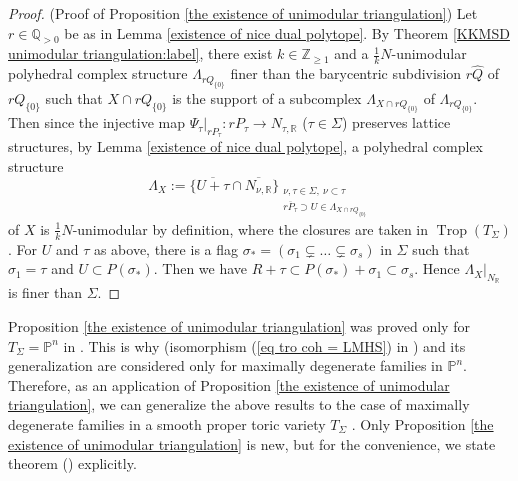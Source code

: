 \documentclass[12pt,a4]{amsart}
\def\P{\mathbb{P}}
\def\R{\mathbb{R}}
\def\Z{\mathbb{Z}}
\def\Q{\mathbb{Q}}
\def\Trop{\mathop{\mathrm{trop}}\nolimits}
\def\Trop{\mathop{\mathrm{Trop}}\nolimits}
\numberwithin{equation}{section}
\numberwithin{figure}{section}
\begin{document}
  \begin{proof}{(Proof of Proposition \ref{the existence of unimodular triangulation})}
    Let $r \in \Q_{>0}$ be as in Lemma \ref{existence of nice dual polytope}. 
    By Theorem \ref{KKMSD unimodular triangulation:label},  
    there exist
     $k \in \Z_{\geq 1}$
     and 
    a $\frac{1}{k}N$-unimodular polyhedral complex structure 
    $\Lambda_{ rQ_{ \{ 0 \} }  }$
       finer than 
         the barycentric subdivision $ r \hat{Q}$ of $rQ_{ \{ 0 \} }$
         such that 
      $X \cap rQ_{ \{ 0 \} }$
      is the support of a subcomplex 
      $\Lambda_{X \cap rQ_{ \{ 0 \} } }$ of $\Lambda_{rQ_{ \{ 0 \} }}$.
      Then since the injective map 
      $ \Psi_{\tau}|_{r P_\tau} \colon  r P_\tau \to N_{\tau, \R}$  ($\tau \in \Sigma$) preserves lattice structures, 
   by 
     Lemma \ref{existence of nice dual polytope}, 
      a  polyhedral complex structure 
    $$ 
     \Lambda_X:= 
       \big\{  \overline{U +\tau} \cap \overline{N_{\nu,\R}}  
      \big\}_{
         \substack{ \nu, \tau \in \Sigma , 
               \ \nu \subset \tau 
          \\
             \overline{rP_{\tau  }} 
            \supset U \in \Lambda_{X \cap rQ_{ \{ 0 \} } }
               }}
     $$
     of $X$ is $\frac{1}{k}N$-unimodular by definition, 
     where the closures are taken in $\Trop (T_{\Sigma})$.
     For $U$ and $\tau$ as above, 
     there is a 
      flag $\sigma_{*}= (\sigma_1 \subsetneq \dots  \subsetneq \sigma_s ) $ in 
     $\Sigma$ 
     such that 
     $\sigma_1=\tau$ 
     and $U \subset P(\sigma_*)$.
     Then we have 
     $ R +\tau \subset P(\sigma_*)+\sigma_1 \subset \sigma_s$.
     Hence  $\Lambda_X |_{N_\R}$
     is finer than $\Sigma$.
  \end{proof}

  Proposition \ref{the existence of unimodular triangulation}
  was proved only for $T_{\Sigma} =\P^n$ in 
  \cite{ItenbergKatzarkovMikhalkinZharkovTropicalhomology2019}.
   This is why 
  \cite[Theorem 1]{ItenbergKatzarkovMikhalkinZharkovTropicalhomology2019}
  (isomorphism (\ref{eq tro coh = LMHS}) in )
  and its generalization 
  \cite[Theorem 7.1]{AksnesAminiPiquerezShawCOHOMOLOGICALLYTROPICALVARIETIES2025} 
  are considered only for maximally degenerate families 
  in $\P^n$.
  Therefore, 
  as an application 
   of Proposition \ref{the existence of unimodular triangulation}, 
  we can generalize the above results 
  to the case of maximally degenerate families in a smooth proper toric variety $T_{\Sigma}$ .
  Only Proposition \ref{the existence of unimodular triangulation} is new, but for the convenience, we state theorem 
  () explicitly.
  
\end{document}
